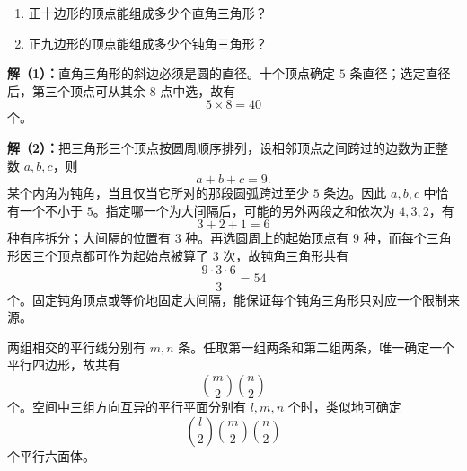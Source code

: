 \begin{examplebox}
  \begin{enumerate}
    \item 正十边形的顶点能组成多少个直角三角形？
    \item 正九边形的顶点能组成多少个钝角三角形？
  \end{enumerate}

  \begin{center}
  \end{center}

  \textbf{解（1）：}直角三角形的斜边必须是圆的直径。十个顶点确定 $5$ 条直径；选定直径后，第三个顶点可从其余 $8$ 点中选，故有
  \[
    5\times8=40
  \]
  个。

  \textbf{解（2）：}把三角形三个顶点按圆周顺序排列，设相邻顶点之间跨过的边数为正整数 $a,b,c$，则
  \[
    a+b+c=9.
  \]
  某个内角为钝角，当且仅当它所对的那段圆弧跨过至少 $5$ 条边。因此 $a,b,c$ 中恰有一个不小于 $5$。指定哪一个为大间隔后，可能的另外两段之和依次为 $4,3,2$，有
  \[
    3+2+1=6
  \]
  种有序拆分；大间隔的位置有 $3$ 种。再选圆周上的起始顶点有 $9$ 种，而每个三角形因三个顶点都可作为起始点被算了 $3$ 次，故钝角三角形共有
  \[
    \frac{9\cdot3\cdot6}{3}=54
  \]
  个。固定钝角顶点或等价地固定大间隔，能保证每个钝角三角形只对应一个限制来源。
\end{examplebox}

\begin{corollarybox}[平行线族确定平行四边形]
  两组相交的平行线分别有 $m,n$ 条。任取第一组两条和第二组两条，唯一确定一个平行四边形，故共有
  \[
    \binom m2\binom n2
  \]
  个。空间中三组方向互异的平行平面分别有 $l,m,n$ 个时，类似地可确定
  \[
    \binom l2\binom m2\binom n2
  \]
  个平行六面体。
\end{corollarybox}

